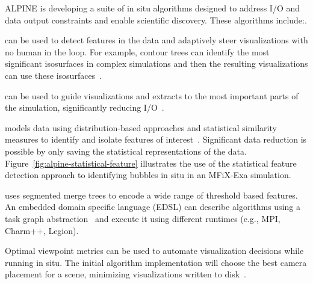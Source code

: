 
ALPINE is developing a suite of in situ  algorithms designed to address I/O and data output constraints and enable scientific discovery.   These algorithms include:.  
\begin{description}  
	\setlength{\itemsep}{1pt}
    \setlength{\parskip}{0pt}
    \setlength{\parsep}{0pt}
	\item [Topological analysis] can be used to detect features in the data and adaptively steer visualizations with no human in the loop.  For example, contour trees can identify the most significant isosurfaces in complex simulations and then the resulting visualizations can use these isosurfaces~\cite{alpine:Carr:TVCG19}.
	\item [Adaptive sampling]  can be used to guide visualizations and extracts to the most important parts of the simulation, significantly reducing I/O~\cite{alpine:Biswas:ISAV18,alpine:Dutta:Entropy19,alpine:Liu:SC19poster}.  %
	\item [Statistical feature detection] models data using distribution-based approaches and statistical similarity measures to identify and isolate features of interest~\cite{alpine:Dutta:PVIS17,alpine:Dutta:VIS15}. Significant data reduction is possible by only saving the statistical representations of the data.  Figure~\ref{fig:alpine-statistical-feature} illustrates the use of the statistical feature detection approach to identifying bubbles in situ in an MFiX-Exa simulation.  
	\item [Task-based feature extraction] uses segmented merge trees to encode a wide range of threshold based features.  An embedded domain specific language (EDSL) can describe algorithms using a  task graph abstraction~\cite{alpine:Landge:SC14,alpine:Petruzza:IPDPS18} and execute it using different runtimes (e.g., MPI, Charm++, Legion).
	\item [Optimal Viewpoint] Optimal viewpoint metrics can be used to automate visualization decisions while running in situ.  The initial algorithm implementation will choose the best camera placement for a scene, minimizing visualizations written to disk~\cite{alpine:Bonaventura:Entropy18,alpine:Marsaglia:UOtech20}.  

\end{description}
